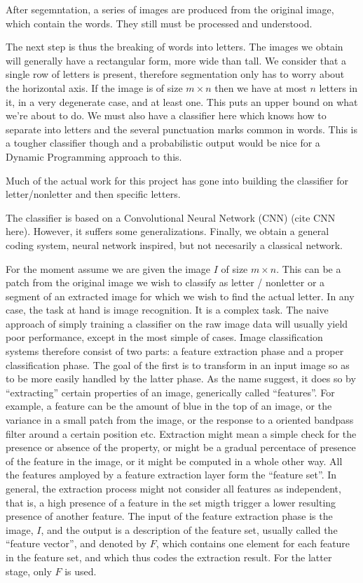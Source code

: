 \documentclass[12pt,a4paper,oneside,english]{UPBThesis}
\newcommand{\hctimes}[2]{{#1}\!\times\!{#2}}
\begin{document}
After segemntation, a series of images are produced from the original image, which contain the words. They still must be processed and understood.

The next step is thus the breaking of words into letters. The images we obtain will generally have a rectangular form, more wide than tall. We consider that a single row of letters is present, therefore segmentation only has to worry about the horizontal axis. If the image is of size $\hctimes{m}{n}$ then we have at most $n$ letters in it, in a very degenerate case, and at least one. This puts an upper bound on what we're about to do. We must also have a classifier here which knows how to separate into letters and the several punctuation marks common in words. This is a tougher classifier though and a probabilistic output would be nice for a Dynamic Programming approach to this.

Much of the actual work for this project has gone into building the classifier for letter/nonletter and then specific letters.

The classifier is based on a Convolutional Neural Network (CNN) (cite CNN here). However, it suffers some generalizations. Finally, we obtain a general coding system, neural network inspired, but not necesarily a classical network.

For the moment assume we are given the image $I$ of size $\hctimes{m}{n}$. This can be a patch from the original image we wish to classify as letter / nonletter or a segment of an extracted image for which we wish to find the actual letter. In any case, the task at hand is image recognition. It is a complex task. The naive approach of simply training a classifier on the raw image data will usually yield poor performance, except in the most simple of cases. Image classification systems therefore consist of two parts: a feature extraction phase and a proper classification phase. The goal of the first is to transform in an input image so as to be more easily handled by the latter phase. As the name suggest, it does so by ``extracting'' certain properties of an image, generically called ``features''. For example, a feature can be the amount of blue in the top of an image, or the variance in a small patch from the image, or the response to a oriented bandpass filter around a certain position etc. Extraction might mean a simple check for the presence or absence of the property, or might be a gradual percentace of presence of the feature in the image, or it might be computed in a whole other way. All the features amployed by a feature extraction layer form the ``feature set''. In general, the extraction process might not consider all features as independent, that is, a high presence of a feature in the set migth trigger a lower resulting presence of another feature. The input of the feature extraction phase is the image, $I$, and the output is a description of the feature set, usually called the ``feature vector'', and denoted by $F$, which contains one element for each feature in the feature set, and which thus codes the extraction result. For the latter stage, only $F$ is used.
\end{document}
